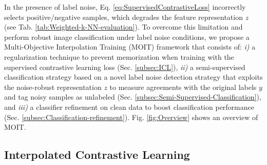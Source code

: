 \documentclass[final]{cvpr}
\begin{document}
In the presence of label noise, Eq. \ref{eq:SupervisedContrastiveLoss} incorrectly selects positive/negative samples, which degrades the feature representation\textbf{ $z$} (see Tab. \ref{tab:Weighted-k-NN-evaluation}).
To overcome this limitation and perform robust image classification under label noise conditions, we propose a Multi-Objective Interpolation Training (MOIT) framework that consists of: \emph{i)} a regularization technique to prevent memorization when training with the supervised contrastive learning loss (Sec. \ref{subsec:ICL}), \emph{ii)} a semi-supervised classification strategy based on a novel label noise detection strategy that exploits the noise-robust representation $z$ to measure agreements with the original labels $y$ and tag noisy samples as unlabeled (Sec. \ref{subsec:Semi-Supervised-Classification}), and \emph{iii)} a classifier refinement on clean data to boost classification performance (Sec. \ref{subsec:Classification-refinement}). Fig. \ref{fig:Overview} shows an overview of MOIT.

\subsection{Interpolated Contrastive Learning\label{subsec:ICL}}
\end{document}
